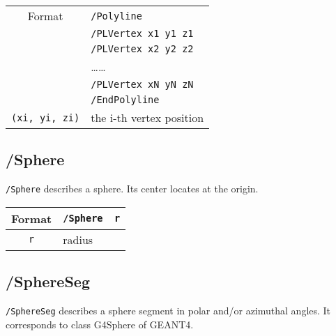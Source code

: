 \begin{tabular}{|c|l|}
\hline%
Format & \verb+/Polyline+\\
       & \verb+/PLVertex x1 y1 z1+\\
       & \verb+/PLVertex x2 y2 z2+\\
       & \ldots\ldots    \\
       & \verb+/PLVertex xN yN zN+\\
       & \verb+/EndPolyline+\\
\hline%
\verb+(xi, yi, zi)+ &  the i-th vertex position\\
\hline%
\end{tabular}
\vspace{.20in}


\subsection{/Sphere}  
\verb+/Sphere+ describes a sphere.
Its center locates at the origin.   
\vspace{.20in}

\begin{tabular}{|c|l|}
\hline%
Format & \verb+/Sphere  r+\\
\hline%
\verb+r+      & radius\\
\hline%
\end{tabular}


\subsection{/SphereSeg}  
\verb+/SphereSeg+ describes a sphere segment in polar and/or azimuthal angles.  
It corresponds to class G4Sphere of GEANT4.
\vspace{.20in}

